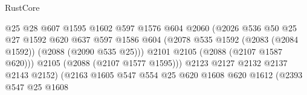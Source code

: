 \begin{lexlean}{RustCore}
\begin{coremodule}
                                              @25
                                              @28
                                              @607
                                              @1595
                                              @1602
                                              @597
                                              @1576
                                              @604
                                              @2060
                                              (@2026
                                                @536
                                                @50
                                                @25
                                                @27
                                                @1592
                                                @620
                                                @637
                                                @597
                                                @1586
                                                @604
                                                (@2078
                                                  @535
                                                  @1592
                                                  (@2083 (@2084 @1592))
                                                  (@2088 (@2090 @535 @25)))
                                                @2101
                                                @2105
                                                (@2088 (@2107 @1587 @620)))
                                              @2105
                                              (@2088 (@2107 @1577 @1595)))
                                            @2123
                                            @2127
                                            @2132
                                            @2137
                                            @2143
                                            @2152)
                                          (@2163
                                            @1605
                                            @547
                                            @554
                                            @25
                                            @620
                                            @1608
                                            @620
                                            @1612
                                            (@2393
                                              @547
                                              @25
                                              @1608

\end{coremodule}
\end{lexlean}
